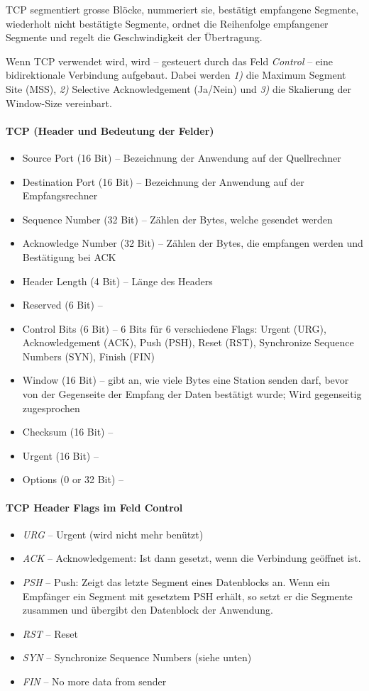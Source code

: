 \documentclass[a4paper,12pt]{article}
\begin{document}
TCP segmentiert grosse Blöcke, nummeriert sie, bestätigt empfangene Segmente, wiederholt nicht bestätigte Segmente, ordnet die Reihenfolge empfangener Segmente und regelt die Geschwindigkeit der Übertragung. 


Wenn TCP verwendet wird, wird -- gesteuert durch das Feld \emph{Control} -- eine bidirektionale Verbindung aufgebaut. Dabei werden \emph{1)} die Maximum Segment Site (MSS), \emph{2)} Selective Acknowledgement (Ja/Nein) und \emph{3)} die Skalierung der Window-Size vereinbart.

\paragraph{TCP (Header und Bedeutung der Felder)}
\begin{itemize}
\item Source Port (16 Bit) -- Bezeichnung der Anwendung auf der Quellrechner
\item Destination Port (16 Bit) -- Bezeichnung der Anwendung auf der Empfangsrechner
\item Sequence Number (32 Bit) -- Zählen der Bytes, welche gesendet werden
\item Acknowledge Number (32 Bit) -- Zählen der Bytes, die empfangen werden und Bestätigung bei ACK
\item Header Length (4 Bit) -- Länge des Headers
\item Reserved (6 Bit) -- 
\item Control Bits (6 Bit) -- 6 Bits für 6 verschiedene Flags: Urgent (URG), Acknowledgement (ACK), Push (PSH), Reset (RST), Synchronize Sequence Numbers (SYN), Finish (FIN)
\item Window (16 Bit) -- gibt an, wie viele Bytes eine Station senden darf, bevor von der Gegenseite der Empfang der Daten bestätigt wurde; Wird gegenseitig zugesprochen
\item Checksum (16 Bit) -- 
\item Urgent (16 Bit) -- 
\item Options (0 or 32 Bit) -- 
\end{itemize} 

\paragraph{TCP Header Flags im Feld Control}
\begin{itemize}
\item \emph{URG} -- Urgent (wird nicht mehr benützt)
\item \emph{ACK} -- Acknowledgement: Ist dann gesetzt, wenn die Verbindung
geöffnet ist.
\item \emph{PSH} -- Push: Zeigt das letzte Segment eines Datenblocks an. Wenn ein Empfänger ein Segment mit gesetztem PSH erhält, so setzt er die Segmente zusammen und übergibt den Datenblock der Anwendung.
\item \emph{RST} -- Reset
\item \emph{SYN} -- Synchronize Sequence Numbers (siehe unten)
\item \emph{FIN} -- No more data from sender
\end{itemize}
\end{document}
